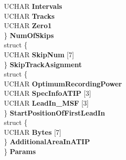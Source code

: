 \begin{DoxyCompactItemize}
\begin{tabbing}
\>\>UCHAR {\bfseries Intervals}\\
\>\>UCHAR {\bfseries Tracks}\\
\>\>UCHAR {\bfseries Zero1}\\
\>\} {\bfseries NumOfSkips}\\
\>struct \{\\
\>\>UCHAR {\bfseries SkipNum} \mbox{[}7\mbox{]}\\
\>\} {\bfseries SkipTrackAsignment}\\
\>struct \{\\
\>\>UCHAR {\bfseries OptimumRecordingPower}\\
\>\>UCHAR {\bfseries SpecInfoATIP} \mbox{[}3\mbox{]}\\
\>\>UCHAR {\bfseries LeadIn\_MSF} \mbox{[}3\mbox{]}\\
\>\} {\bfseries StartPositionOfFirstLeadIn}\\
\>struct \{\\
\>\>UCHAR {\bfseries Bytes} \mbox{[}7\mbox{]}\\
\>\} {\bfseries AdditionalAreaInATIP}\\
\} {\bfseries Params}\\


\end{tabbing}
\end{DoxyCompactItemize}
